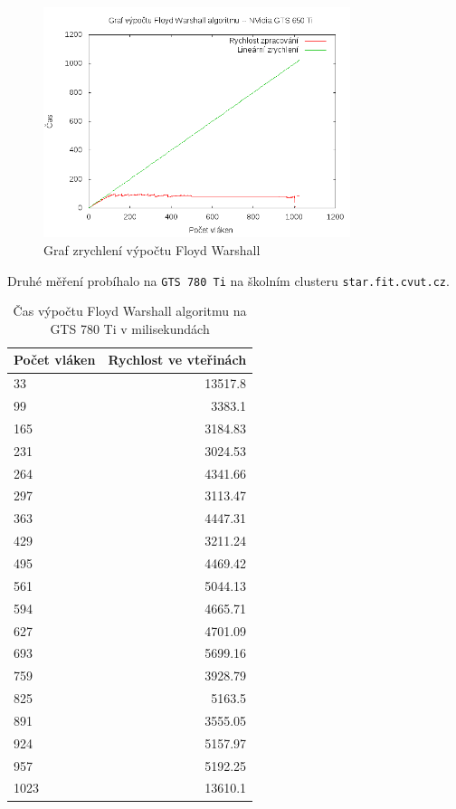 \documentclass[10pt,a4paper]{article}
\begin{document}
\begin{figure}[H]
  \centering
    \includegraphics[width=0.8\textwidth]{graf_floyd_gts_650_Ti.png}
  \caption{Graf zrychlení výpočtu Floyd Warshall}
  \label{fig:floydcuda}
\end{figure}


Druhé měření probíhalo na \texttt{GTS 780 Ti} na školním clusteru \texttt{star.fit.cvut.cz}.

\begin{table}[H]
  \centering
	\caption{Čas výpočtu Floyd Warshall algoritmu na GTS 780 Ti v milisekundách}
	\begin{tabular}{| l | r |}
\hline
Počet vláken & Rychlost ve vteřinách \\ \hline
33 & 13517.8 \\ \hline
99 & 3383.1 \\ \hline
165 & 3184.83 \\ \hline
231 & 3024.53 \\ \hline
264 & 4341.66 \\ \hline
297 & 3113.47 \\ \hline
363 & 4447.31 \\ \hline
429 & 3211.24 \\ \hline
495 & 4469.42 \\ \hline
561 & 5044.13 \\ \hline
594 & 4665.71 \\ \hline
627 & 4701.09 \\ \hline
693 & 5699.16 \\ \hline
759 & 3928.79 \\ \hline
825 & 5163.5 \\ \hline
891 & 3555.05 \\ \hline
924 & 5157.97 \\ \hline
957 & 5192.25 \\ \hline
1023 & 13610.1 \\ \hline
	\end{tabular}
  \label{tab:cufltwo}
\end{table}
\end{document}
